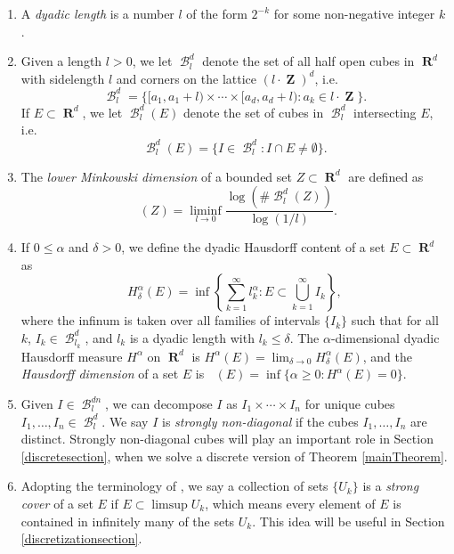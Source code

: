 \documentclass[dvipsnames,letterpaper,12pt]{article}
\numberwithin{equation}{section}
\theoremstyle{plain}
\theoremstyle{remark}
\DeclareMathOperator{\hausdim}{\dim_{\mathbf{H}}}
\DeclareMathOperator{\lowminkdim}{\underline{\dim}_{\mathbf{M}}}
\DeclareMathOperator{\RR}{\mathbf{R}}
\DeclareMathOperator{\ZZ}{\mathbf{Z}}
\DeclareMathOperator{\B}{\mathcal{B}}
\begin{document}
\begin{enumerate}%
	\item\label{defDyadicLength} A {\it dyadic length} is a number $l$ of the form $2^{-k}$ for some non-negative integer $k$.

	\item\label{defDyadicGrid} Given a length $l > 0$, we let $\B^d_l$ denote the set of all half open cubes in $\RR^d$ with sidelength $l$ and corners on the lattice $(l \cdot \ZZ)^d$, i.e.
	\[ \B^d_l = \{ [a_1, a_1 + l) \times \cdots \times [a_d, a_d+l) : a_k \in l \cdot \ZZ \}. \]
	If $E \subset \RR^d$, we let $\B^d_l(E)$ denote the set of cubes in $\B^d_l$ intersecting $E$, i.e.
	\[ \B^d_l(E) = \{ I \in \B^d_l : I \cap E \neq \emptyset \}. \]

	\item\label{defnMinkowskiDim} The {\it lower Minkowski dimension} of a bounded set $Z \subset \RR^d$ are defined as
	\[ \lowminkdim(Z) = \liminf_{l \to 0} \frac{\log(\# \B^d_l(Z))}{\log(1/l)}. \]

	\item\label{defHausdorffDim} If $0 \leq \alpha$ and $\delta > 0$, we define the dyadic Hausdorff content of a set $E\subset\RR^d$ as 
	\[ H^\alpha_\delta(E) = \inf \left\{ \sum_{k = 1}^\infty l_k^\alpha : E \subset \bigcup_{k = 1}^\infty I_k \right\}, \]
	where the infinum is taken over all families of intervals $\{ I_k \}$ such that for all $k$, $I_k \in \B^d_{l_k}$, and $l_k$ is a dyadic length with $l_k \leq \delta$. The $\alpha$-dimensional dyadic Hausdorff measure $H^\alpha$ on $\RR^d$ is $H^\alpha(E) = \lim_{\delta \to 0} H_\delta^\alpha(E)$, and the {\it Hausdorff dimension} of a set $E$ is $\hausdim(E) = \inf \{ \alpha \geq 0 : H^\alpha(E) = 0 \}$.

	\item\label{defStronglyNonDiagonal} Given $I \in \B^{dn}_l$, we can decompose $I$ as $I_1 \times \cdots \times I_n$ for unique cubes $I_1, \dots, I_n \in \B_l^d$. We say $I$ is {\it strongly non-diagonal} if the cubes $I_1, \dots, I_n$ are distinct. Strongly non-diagonal cubes will play an important role in Section \ref{discretesection}, when we solve a discrete version of Theorem \ref{mainTheorem}.

	\item\label{defStrongCover} Adopting the terminology of \cite{KatzTao}, we say a collection of sets $\{ U_k \}$ is a {\it strong cover} of a set $E$ if $E \subset \limsup U_k$, which means every element of $E$ is contained in infinitely many of the sets $U_k$. This idea will be useful in Section \ref{discretizationsection}.  


\end{enumerate}
\end{document}
